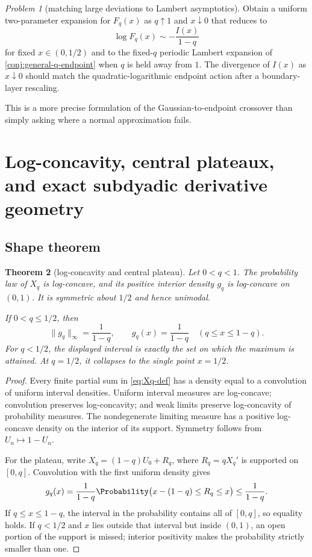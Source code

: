 \documentclass[11pt,oneside]{article}
\newtheorem{theorem}{Theorem}[section]
\theoremstyle{definition}
\theoremstyle{remark}
\newtheorem{problem}[theorem]{Problem}
\begin{document}
\begin{problem}[matching large deviations to Lambert asymptotics]\label{prob:ldp-lambert}
Obtain a uniform two-parameter expansion for $F_q(x)$ as $q\uparrow1$ and $x\downarrow0$ that reduces to
\[
 \log F_q(x)\sim-\frac{I(x)}{1-q}
\]
for fixed $x\in(0,1/2)$ and to the fixed-$q$ periodic Lambert expansion of \cref{conj:general-q-endpoint} when $q$ is held away from $1$.  The divergence of $I(x)$ as $x\downarrow0$ should match the quadratic-logarithmic endpoint action after a boundary-layer rescaling.
\end{problem}

This is a more precise formulation of the Gaussian-to-endpoint crossover than simply asking where a normal approximation fails.

\section{Log-concavity, central plateaux, and exact subdyadic derivative geometry}

\subsection{Shape theorem}

\begin{theorem}[log-concavity and central plateau]\label{thm:shape}
Let $0<q<1$.  The probability law of $X_q$ is log-concave, and its positive interior density $g_q$ is log-concave on $(0,1)$.  It is symmetric about $1/2$ and hence unimodal.

If $0<q\le1/2$, then
\begin{equation}\label{eq:plateau}
 \|g_q\|_\infty=\frac1{1-q},
 \qquad
 g_q(x)=\frac1{1-q}\quad(q\le x\le1-q).
\end{equation}
For $q<1/2$, the displayed interval is exactly the set on which the maximum is attained.  At $q=1/2$, it collapses to the single point $x=1/2$.
\end{theorem}

\begin{proof}
Every finite partial sum in \cref{eq:Xq-def} has a density equal to a convolution of uniform interval densities.  Uniform interval measures are log-concave; convolution preserves log-concavity; and weak limits preserve log-concavity of probability measures.  The nondegenerate limiting measure has a positive log-concave density on the interior of its support.  Symmetry follows from $U_n\mapsto1-U_n$.

For the plateau, write $X_q=(1-q)U_0+R_q$, where $R_q=qX_q'$ is supported on $[0,q]$.  Convolution with the first uniform density gives
\[
 g_q(x)=\frac1{1-q}\Probability\bigl(x-(1-q)\le R_q\le x\bigr)
 \le\frac1{1-q}.
\]
If $q\le x\le1-q$, the interval in the probability contains all of $[0,q]$, so equality holds.  If $q<1/2$ and $x$ lies outside that interval but inside $(0,1)$, an open portion of the support is missed; interior positivity makes the probability strictly smaller than one.
\end{proof}
\end{document}
